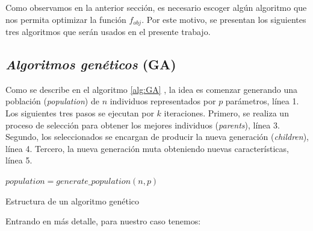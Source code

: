 Como observamos en la anterior sección, es necesario escoger algún algoritmo
que nos permita optimizar la función $f_{obj}$. 
Por este motivo, se presentan los siguientes tres algoritmos que serán usados en el presente trabajo.

\subsection{\emph{Algoritmos genéticos} (GA)}

Como se describe en el algoritmo \ref{alg:GA} \citep{Mykel2019}, la idea es  
comenzar generando una población (\emph{population}) de $n$ individuos representados por $p$
parámetros, línea 1. 
Los siguientes tres pasos se ejecutan por $k$ iteraciones.
Primero, se realiza un proceso de selección para obtener los mejores individuos
(\emph{parents}), línea 3.
Segundo, los seleccionados se encargan de producir la nueva generación
(\emph{children}), línea 4.
Tercero, la nueva generación muta obteniendo nuevas características, línea 5.

\begin{algorithm}
$population = generate\_population(n, p)$ \\
\caption{Estructura de un algoritmo genético}
\label{alg:GA}
\end{algorithm}

Entrando en más detalle, para nuestro caso tenemos:

